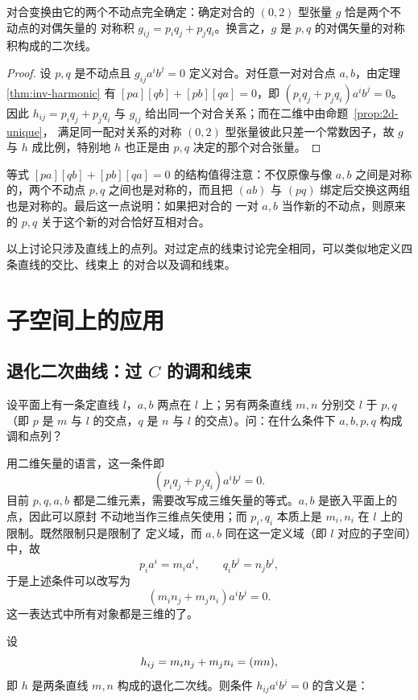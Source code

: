 \begin{proposition}\label{prop:inv-fixedpts}
对合变换由它的两个不动点完全确定：确定对合的 $(0,2)$ 型张量 $g$ 恰是两个不动点的对偶矢量的
对称积 $g_{ij}=p_iq_j+p_jq_i$。换言之，$g$ 是 $p,q$ 的对偶矢量的对称积构成的二次线。
\end{proposition}

\begin{proof}
设 $p,q$ 是不动点且 $g_{ij}a^ib^j=0$ 定义对合。对任意一对对合点 $a,b$，由定理
\ref{thm:inv-harmonic} 有 $[pa][qb]+[pb][qa]=0$，即 $(p_iq_j+p_jq_i)a^ib^j=0$。因此
$h_{ij}=p_iq_j+p_jq_i$ 与 $g_{ij}$ 给出同一个对合关系；而在二维中由命题~\ref{prop:2d-unique}，
满足同一配对关系的对称 $(0,2)$ 型张量彼此只差一个常数因子，故 $g$ 与 $h$ 成比例，特别地
$h$ 也正是由 $p,q$ 决定的那个对合张量。
\end{proof}

等式 $[pa][qb]+[pb][qa]=0$ 的结构值得注意：不仅原像与像 $a,b$ 之间是对称的，两个不动点 $p,q$
之间也是对称的，而且把 $(ab)$ 与 $(pq)$ 绑定后交换这两组也是对称的。最后这一点说明：如果把对合的
一对 $a,b$ 当作新的不动点，则原来的 $p,q$ 关于这个新的对合恰好互相对合。

以上讨论只涉及直线上的点列。对过定点的线束讨论完全相同，可以类似地定义四条直线的交比、线束上
的对合以及调和线束。

\section{子空间上的应用}

\subsection{退化二次曲线：过 $C$ 的调和线束}

设平面上有一条定直线 $l$，$a,b$ 两点在 $l$ 上；另有两条直线 $m,n$ 分别交 $l$ 于 $p,q$
（即 $p$ 是 $m$ 与 $l$ 的交点，$q$ 是 $n$ 与 $l$ 的交点）。问：在什么条件下 $a,b,p,q$ 构成
调和点列？

用二维矢量的语言，这一条件即
\[
(p_iq_j+p_jq_i)a^ib^j=0 .
\]
目前 $p,q,a,b$ 都是二维元素，需要改写成三维矢量的等式。$a,b$ 是嵌入平面上的点，因此可以原封
不动地当作三维点矢使用；而 $p_i,q_i$ 本质上是 $m_i,n_i$ 在 $l$ 上的限制。既然限制只是限制了
定义域，而 $a,b$ 同在这一定义域（即 $l$ 对应的子空间）中，故
\[
p_ia^i=m_ia^i,\qquad q_ib^j=n_jb^j ,
\]
于是上述条件可以改写为
\[
(m_in_j+m_jn_i)a^ib^j=0 .
\]
这一表达式中所有对象都是三维的了。

设
\[
h_{ij}=m_in_j+m_jn_i=(mn),
\]
即 $h$ 是两条直线 $m,n$ 构成的退化二次线。则条件 $h_{ij}a^ib^j=0$ 的含义是：

